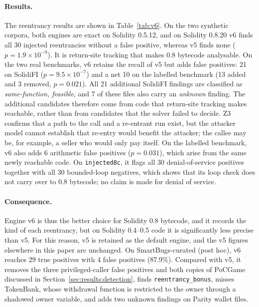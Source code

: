 \documentclass[pdflatex,sn-mathphys]{sn-jnl}
\theoremstyle{thmstyletwo}
\theoremstyle{thmstyletwo}
\begin{document}
\paragraph{Results.} The reentrancy results are shown in Table~\ref{tab:v6}. On the two synthetic corpora, both engines are exact on Solidity 0.5.12, and on Solidity 0.8.20 v6 finds all 30 injected reentrancies without a false positive, whereas v5 finds none ($p = 1.9 \times 10^{-9}$). It is return-site tracking that makes 0.8 bytecode analysable. On the two real benchmarks, v6 retains the recall of v5 but adds false positives: 21 on SolidiFI ($p = 9.5 \times 10^{-7}$) and a net 10 on the labelled benchmark (13 added and 3 removed, $p = 0.021$). All 21 additional SolidiFI findings are classified as \emph{same-function, feasible}, and 7 of these files also carry an \emph{unknown} finding. The additional candidates therefore come from code that return-site tracking makes reachable, rather than from candidates that the solver failed to decide. Z3 confirms that a path to the call and a re-entrant run exist, but the attacker model cannot establish that re-entry would benefit the attacker; the callee may be, for example, a seller who would only pay itself. On the labelled benchmark, v6 also adds 6 arithmetic false positives ($p = 0.031$), which arise from the same newly reachable code. On \texttt{injected8c}, it flags all 30 denial-of-service positives together with all 30 bounded-loop negatives, which shows that its loop check does not carry over to 0.8 bytecode; no claim is made for denial of service.

\paragraph{Consequence.} Engine v6 is thus the better choice for Solidity 0.8 bytecode, and it records the kind of each reentrancy, but on Solidity 0.4--0.5 code it is significantly less precise than v5. For this reason, v5 is retained as the default engine, and the v5 figures elsewhere in this paper are unchanged. On SmartBugs-curated (post hoc), v6 reaches 29 true positives with 4 false positives (87.9\%). Compared with v5, it removes the three privileged-caller false positives and both copies of PoCGame discussed in Section~\ref{sec:results:detection}, finds \texttt{reentrancy\_bonus}, misses TokenBank, whose withdrawal function is restricted to the owner through a shadowed owner variable, and adds two unknown findings on Parity wallet files.

\end{document}
